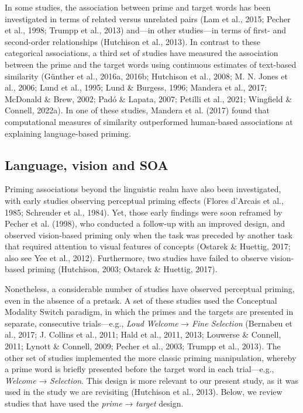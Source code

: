 \documentclass[
  12pt,
  man,floatsintext]{apa7}
\begin{document}
In some studies, the association between prime and target words has been investigated in terms of related versus unrelated pairs (Lam et al., 2015; Pecher et al., 1998; Trumpp et al., 2013) and---in other studies---in terms of first- and second-order relationships (Hutchison et al., 2013). In contrast to these categorical associations, a third set of studies have measured the association between the prime and the target words using continuous estimates of text-based similarity (Günther et al., 2016a, 2016b; Hutchison et al., 2008; M. N. Jones et al., 2006; Lund et al., 1995; Lund \& Burgess, 1996; Mandera et al., 2017; McDonald \& Brew, 2002; Padó \& Lapata, 2007; Petilli et al., 2021; Wingfield \& Connell, 2022a). In one of these studies, Mandera et al. (2017) found that computational measures of similarity outperformed human-based associations at explaining language-based priming.

\hypertarget{language-vision-and-soa}{%
\subsection{Language, vision and SOA}\label{language-vision-and-soa}}

Priming associations beyond the linguistic realm have also been investigated, with early studies observing perceptual priming effects (Flores d'Arcais et al., 1985; Schreuder et al., 1984). Yet, those early findings were soon reframed by Pecher et al. (1998), who conducted a follow-up with an improved design, and observed vision-based priming only when the task was preceded by another task that required attention to visual features of concepts (Ostarek \& Huettig, 2017; also see Yee et al., 2012). Furthermore, two studies have failed to observe vision-based priming (Hutchison, 2003; Ostarek \& Huettig, 2017).

Nonetheless, a considerable number of studies have observed perceptual priming, even in the absence of a pretask. A set of these studies used the Conceptual Modality Switch paradigm, in which the primes and the targets are presented in separate, consecutive trials---e.g., \emph{Loud Welcome} → \emph{Fine Selection} (Bernabeu et al., 2017; J. Collins et al., 2011; Hald et al., 2011, 2013; Louwerse \& Connell, 2011; Lynott \& Connell, 2009; Pecher et al., 2003; Trumpp et al., 2013). The other set of studies implemented the more classic priming manipulation, whereby a prime word is briefly presented before the target word in each trial---e.g., \emph{Welcome} → \emph{Selection}. This design is more relevant to our present study, as it was used in the study we are revisiting (Hutchison et al., 2013). Below, we review studies that have used the \emph{prime} → \emph{target} design.
\end{document}
